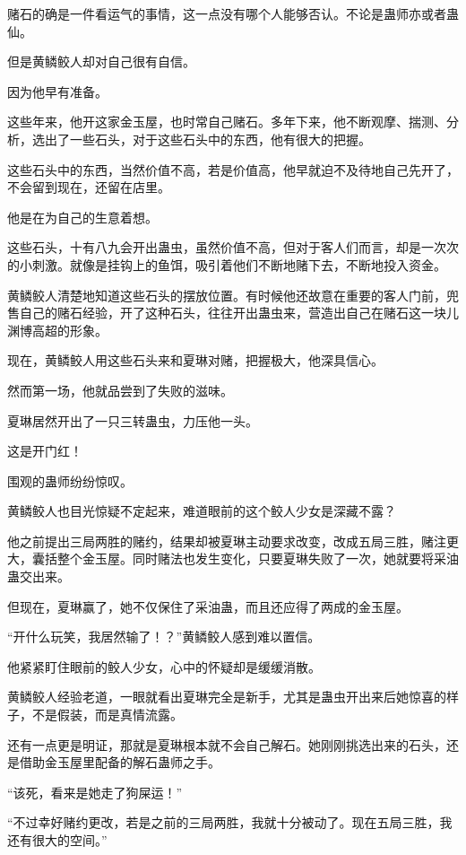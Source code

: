 
\begin{this_body}

赌石的确是一件看运气的事情，这一点没有哪个人能够否认。不论是蛊师亦或者蛊仙。

但是黄鳞鲛人却对自己很有自信。

因为他早有准备。

这些年来，他开这家金玉屋，也时常自己赌石。多年下来，他不断观摩、揣测、分析，选出了一些石头，对于这些石头中的东西，他有很大的把握。

这些石头中的东西，当然价值不高，若是价值高，他早就迫不及待地自己先开了，不会留到现在，还留在店里。

他是在为自己的生意着想。

这些石头，十有八九会开出蛊虫，虽然价值不高，但对于客人们而言，却是一次次的小刺激。就像是挂钩上的鱼饵，吸引着他们不断地赌下去，不断地投入资金。

黄鳞鲛人清楚地知道这些石头的摆放位置。有时候他还故意在重要的客人门前，兜售自己的赌石经验，开了这种石头，往往开出蛊虫来，营造出自己在赌石这一块儿渊博高超的形象。

现在，黄鳞鲛人用这些石头来和夏琳对赌，把握极大，他深具信心。

然而第一场，他就品尝到了失败的滋味。

夏琳居然开出了一只三转蛊虫，力压他一头。

这是开门红！

围观的蛊师纷纷惊叹。

黄鳞鲛人也目光惊疑不定起来，难道眼前的这个鲛人少女是深藏不露？

他之前提出三局两胜的赌约，结果却被夏琳主动要求改变，改成五局三胜，赌注更大，囊括整个金玉屋。同时赌法也发生变化，只要夏琳失败了一次，她就要将采油蛊交出来。

但现在，夏琳赢了，她不仅保住了采油蛊，而且还应得了两成的金玉屋。

“开什么玩笑，我居然输了！？”黄鳞鲛人感到难以置信。

他紧紧盯住眼前的鲛人少女，心中的怀疑却是缓缓消散。

黄鳞鲛人经验老道，一眼就看出夏琳完全是新手，尤其是蛊虫开出来后她惊喜的样子，不是假装，而是真情流露。

还有一点更是明证，那就是夏琳根本就不会自己解石。她刚刚挑选出来的石头，还是借助金玉屋里配备的解石蛊师之手。

“该死，看来是她走了狗屎运！”

“不过幸好赌约更改，若是之前的三局两胜，我就十分被动了。现在五局三胜，我还有很大的空间。”


\end{this_body}
